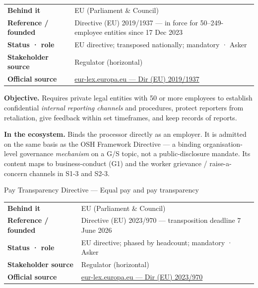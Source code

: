 {\def\LTcaptype{none}
\begin{longtable}[]{@{}
  >{\raggedright\arraybackslash}p{}
  >{\raggedright\arraybackslash}p{}@{}}
\toprule\noalign{}
\endhead
\bottomrule\noalign{}
\endlastfoot
\textbf{Behind it} & EU (Parliament \& Council) \\
\textbf{Reference / founded} & Directive (EU) 2019/1937 --- in force for 50--249-employee entities since 17 Dec 2023 \\
\textbf{Status · role} & EU directive; transposed nationally; mandatory · Asker \\
\textbf{Stakeholder source} & Regulator (horizontal) \\
\textbf{Official source} & \href{https://eur-lex.europa.eu/eli/dir/2019/1937/oj}{eur-lex.europa.eu --- Dir (EU) 2019/1937} \\
\end{longtable}
}

\textbf{Objective.} Requires private legal entities with 50 or more employees to establish confidential \emph{internal reporting channels} and procedures, protect reporters from retaliation, give feedback within set timeframes, and keep records of reports.

\textbf{In the ecosystem.} Binds the processor directly as an employer. It is admitted on the same basis as the OSH Framework Directive --- a binding organisation-level governance \emph{mechanism} on a G/S topic, not a public-disclosure mandate. Its content maps to business-conduct (G1) and the worker grievance / raise-a-concern channels in S1-3 and S2-3.

Pay Transparency Directive --- Equal pay and pay transparency

{\def\LTcaptype{none}
\begin{longtable}[]{@{}
  >{\raggedright\arraybackslash}p{}
  >{\raggedright\arraybackslash}p{}@{}}
\toprule\noalign{}
\endhead
\bottomrule\noalign{}
\endlastfoot
\textbf{Behind it} & EU (Parliament \& Council) \\
\textbf{Reference / founded} & Directive (EU) 2023/970 --- transposition deadline 7 June 2026 \\
\textbf{Status · role} & EU directive; phased by headcount; mandatory · Asker \\
\textbf{Stakeholder source} & Regulator (horizontal) \\
\textbf{Official source} & \href{https://eur-lex.europa.eu/eli/dir/2023/970/oj}{eur-lex.europa.eu --- Dir (EU) 2023/970} \\
\end{longtable}
}

